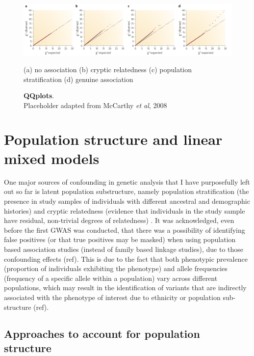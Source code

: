 \begin{figure}[h]
\centering
\includegraphics[width=15cm]{Chapter2/Fig/qqplots.png}
\caption{\textbf{QQplots}.\\
Placeholder adapted from McCarthy \textit{et al}, 2008}
(a) no association (b) cryptic relatedness (c) population stratification (d) genuine association
\end{figure}



\section{Population structure and linear mixed models}

One major sources of confounding in genetic analysis that I have purposefully left out so far is latent population substructure, namely population stratification (the presence in study samples of individuals with different ancestral and demographic histories) and cryptic relatedness (evidence that individuals in the study sample have residual, non-trivial degrees of relatedness) \cite{mccarthy2008genome}.
It was acknowledged, even before the first GWAS was conducted, that there was a possibility of identifying false positives (or that true positives may be masked) when using population based association studies (instead of family based linkage studies), due to those confounding effects (ref). 
This is due to the fact that both phenotypic prevalence (proportion of individuals exhibiting the phenotype) and allele frequencies (frequency of a specific allele within a population) vary across different populations, which may result in the identification of variants that are indirectly associated with the phenotype of interest due to ethnicity or population sub-structure (ref).


\subsection{Approaches to account for population structure}

